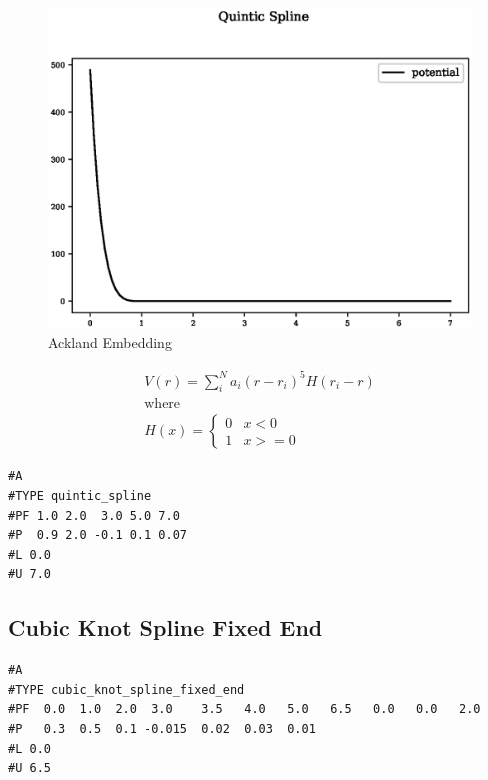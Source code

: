 \begin{figure}[h]
  \begin{center}
    \includegraphics[width=120mm]{appendix/functions/plots/quintic_spline.eps}
    \caption{Ackland Embedding}
    \label{graph:graph1}
  \end{center}
\end{figure}

\begin{equation}
\begin{split}
V(r) = \sum_i^N a_i (r - r_i)^5 H(r_i - r) \\
\text{where } \\
H(x) = \left\{ \begin{matrix} 0 & x<0 \\  1 & x >= 0 \end{matrix} \right . 
\end{split}
\label{eq:quinticSpline}
\end{equation}

\begin{lstlisting}[style=sPseudo,caption={Quintic Splines}]
#A
#TYPE quintic_spline
#PF 1.0 2.0  3.0 5.0 7.0
#P  0.9 2.0 -0.1 0.1 0.07
#L 0.0
#U 7.0
\end{lstlisting}






\clearpage
\FloatBarrier
\subsection{Cubic Knot Spline Fixed End}


\begin{lstlisting}[style=sPseudo,caption={Poly5 Node Spline}]
#A
#TYPE cubic_knot_spline_fixed_end
#PF  0.0  1.0  2.0  3.0    3.5   4.0   5.0   6.5   0.0   0.0   2.0
#P   0.3  0.5  0.1 -0.015  0.02  0.03  0.01
#L 0.0
#U 6.5
\end{lstlisting}







